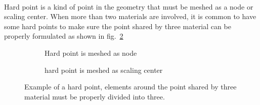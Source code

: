 \paragraph{}
Hard point is a kind of point in the geometry that must be meshed as a node or scaling center.
When more than two materials are involved, it is common to have some hard points to make sure the point shared by three material can be properly formulated as shown in fig.~\ref{qdt_fig:qdt_hard_point_demo}
    \begin{figure}[!ht]
        \begin{subfigure}[b]{0.5\linewidth}
            \centering
        \caption{Hard point is meshed as node}
        \end{subfigure}
        \begin{subfigure}[b]{0.5\linewidth}
            \centering
        \caption{hard point is meshed as scaling center}
        \label{qdt_fig:qdt_hard_point_demo_sc}
        \end{subfigure}
        \caption[Example of a hard point]{Example of a hard point, elements around the point shared by three material must be properly divided into three.}
        \label{qdt_fig:qdt_hard_point_demo}
    \end{figure}
